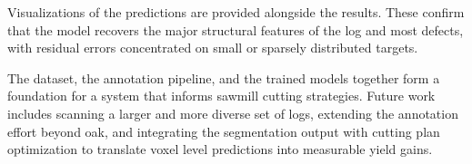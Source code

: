 Visualizations of the predictions are provided alongside the results. These confirm that the model recovers the major structural features of the log and most defects, with residual errors concentrated on small or sparsely distributed targets.

The dataset, the annotation pipeline, and the trained models together form a foundation for a system that informs sawmill cutting strategies. Future work includes scanning a larger and more diverse set of logs, extending the annotation effort beyond oak, and integrating the segmentation output with cutting plan optimization to translate voxel level predictions into measurable yield gains.